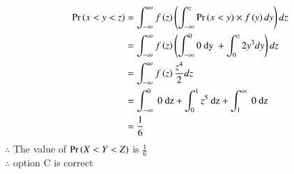 \documentclass[journal,12pt,twocolumn]{IEEEtran}
\begin{document}
\begin{align}
\Pr\left(x<y<z\right)&=\int_{-\infty}^{\infty} f\left(z\right)\left(\int _{-\infty}^z \Pr\left(x<y\right)\times f\left(y\right)dy\right)dz\\
&=\int_{-\infty}^{\infty}f\left(z\right)\left(\int_{-\infty}^0 \text{0 dy }+ \int _0^z 2y^3dy\right)dz\nonumber\\
&=\int_{-\infty}^{\infty}f\left(z\right)\frac{z^4}{2}dz\nonumber\\
&=\int_{-\infty}^{0}\text{ 0 dz}+\int_{0}^{1}z^5\text{ dz} +\int_{1}^{\infty}\text{ 0 dz}\nonumber\\
&=\frac{1}{6}
\end{align}
$\therefore$ The value of $\Pr\left(X<Y<Z\right)$ is $\frac{1}{6}$ \\
$\therefore$ option C is correct
\end{document}
